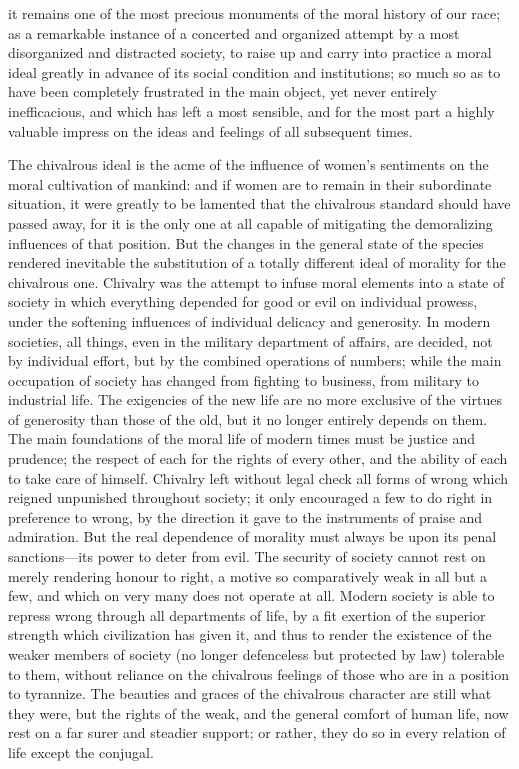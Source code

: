 \documentclass[12pt]{report}
\begin{document}
it remains one of the most precious monuments of the moral history of our race; as a remarkable instance of a concerted and organized attempt by a most disorganized and distracted society, to raise up and carry into practice a moral ideal greatly in advance of its social condition and institutions; so much so as to have been completely frustrated in the main object, yet never entirely inefficacious, and which has left a most sensible, and for the most part a highly valuable impress on the ideas and feelings of all subsequent times.

The chivalrous ideal is the acme of the influence of women's sentiments on the moral cultivation of mankind: and if women are to remain in their subordinate situation, it were greatly to be lamented that the chivalrous standard should have passed away, for it is the only one at all capable of mitigating the demoralizing influences of that position. But the changes in the general state of the species rendered inevitable the substitution of a totally different ideal of morality for the chivalrous one. Chivalry was the attempt to infuse moral elements into a state of society in which everything depended for good or evil on individual prowess, under the softening influences of individual delicacy and generosity. In modern societies, all things, even in the military department of affairs, are decided, not by individual effort, but by the combined operations of numbers; while the main occupation of society has changed from fighting to business, from military to industrial life. The exigencies of the new life are no more exclusive of the virtues of generosity than those of the old, but it no longer entirely depends on them. The main foundations of the moral life of modern times must be justice and prudence; the respect of each for the rights of every other, and the ability of each to take care of himself. Chivalry left without legal check all forms of wrong which reigned unpunished throughout society; it only encouraged a few to do right in preference to wrong, by the direction it gave to the instruments of praise and admiration. But the real dependence of morality must always be upon its penal sanctions—its power to deter from evil. The security of society cannot rest on merely rendering honour to right, a motive so comparatively weak in all but a few, and which on very many does not operate at all. Modern society is able to repress wrong through all departments of life, by a fit exertion of the superior strength which civilization has given it, and thus to render the existence of the weaker members of society (no longer defenceless but protected by law) tolerable to them, without reliance on the chivalrous feelings of those who are in a position to tyrannize. The beauties and graces of the chivalrous character are still what they were, but the rights of the weak, and the general comfort of human life, now rest on a far surer and steadier support; or rather, they do so in every relation of life except the conjugal.
\end{document}
